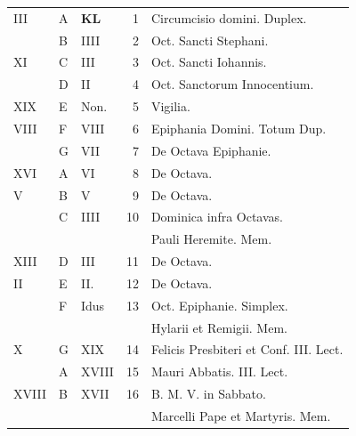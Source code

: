 \begin{center}
\begin{tabular}{l | l | l | r | l l}
 \color{Red} III & \color{Red} A & \textbf{\color{Red} K\color{Blue}L} & 1 & \color{Red} Circumcisio domini. \color{Red} Duplex. \\
 & B & \color{Red} IIII & 2 & Oct. Sancti Stephani. & \color{Red} \\
\color{Red} XI & C & \color{Red} III & 3 & Oct. Sancti Iohannis. & \\
& D & \color{Red} II & 4 & \color{Red} Oct. Sanctorum Innocentium. & \color{Red} \\
\color{Red} XIX & E & \color{Red} Non. & 5 & \qquad Vigilia. \color{Red} \\
\color{Red} VIII & F & \color{Red} VIII & 6 & Epiphania Domini. Totum Dup. \\
 & G & \color{Red} VII & 7 & De Octava Epiphanie. \\
\color{Red} XVI & \color{Red} A & \color{Red} VI & 8 & De Octava. & \\
\color{Red} V & B & \color{Red} V & 9 & De Octava. & \\
 & C & \color{Red} IIII & 10 & Dominica infra Octavas. \\
 &  & & & \quad Pauli Heremite. \color{Red} Mem. \\
\color{Red} XIII & D & \color{Red} III & 11 & De Octava. & \color{Red} \\
\color{Red} II & E & \color{Red} II. & 12 & De Octava. & \color{Red} \\
 & F & \color{Red} Idus & 13 & \multicolumn{2}{l}{Oct. Epiphanie. \color{Red} Simplex.} \\
 &  & & & \multicolumn{2}{l}{\quad \color{black} Hylarii et Remigii. \color{Red} Mem.} \\
\color{Red} X & G & \color{Red} XIX & 14 & \multicolumn{2}{l}{Felicis Presbiteri et Conf. III. Lect.} \\
 & \color{Red} A & \color{Red} XVIII & 15 & \color{Red} Mauri Abbatis. III. Lect. \\
\color{Red} XVIII & B & \color{Red} XVII & 16 & B. M. V. in Sabbato. \\
 &  & & & \quad Marcelli Pape et Martyris. Mem. \\

\end{tabular}
\end{center}
